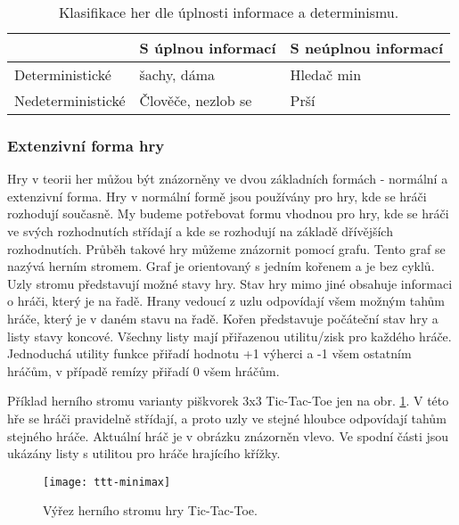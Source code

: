 \begin{table*}[b]\footnotesize
\vspace*{0mm}
\caption{{\label{tab:klasifikaceher}} Klasifikace her dle úplnosti informace a determinismu.}
\vspace*{0mm}
\label{shadowtable}
\begin{center}
\begin{tabular}{ l || l | l |}
 & S úplnou informací & S neúplnou informací \\
\hline
\hline
Deterministické & šachy, dáma & Hledač min \\ \hline
Nedeterministické  & Člověče, nezlob se & Prší \\ \hline
\end{tabular}
\end{center}
\end{table*}

\subsubsection{Extenzivní forma hry}

Hry v teorii her můžou být znázorněny ve dvou základních formách - normální a extenzivní forma. Hry v normální formě jsou používány pro hry, kde se hráči rozhodují současně. My budeme potřebovat formu vhodnou pro hry, kde se hráči ve svých rozhodnutích střídají a kde se rozhodují na základě dřívějších rozhodnutích. Průběh takové hry můžeme znázornit pomocí grafu. Tento graf se nazývá herním stromem. Graf je orientovaný s jedním kořenem a je bez cyklů. Uzly stromu představují možné stavy hry. Stav hry mimo jiné obsahuje informaci o hráči, který je na řadě. Hrany vedoucí z uzlu odpovídají všem možným tahům hráče, který je v daném stavu na řadě. Kořen představuje počáteční stav hry a listy stavy koncové. Všechny listy mají přiřazenou utilitu/zisk pro každého hráče. Jednoduchá utility funkce přiřadí hodnotu +1 výherci a -1 všem ostatním hráčům, v případě remízy přiřadí 0 všem hráčům.

Příklad herního stromu varianty piškvorek 3x3 Tic-Tac-Toe jen na obr. \ref{fig-ttt-minimax}. V této hře se hráči pravidelně střídají, a proto uzly ve stejné hloubce odpovídají tahům stejného hráče. Aktuální hráč je v obrázku znázorněn vlevo. Ve spodní části jsou ukázány listy s utilitou pro hráče hrajícího křížky.

\begin{figure}
  \centering
  \texttt{[image: ttt-minimax]}
	\caption{ Výřez herního stromu hry Tic-Tac-Toe\cite{tictactoe}. }
	\label{fig-ttt-minimax}
\end{figure}

